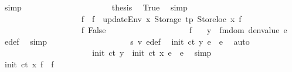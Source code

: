 \begin{isabellebody}
\ simp\isanewline
\ \ \ \ \ \ \ \ \ \ \ \ \ \ \ \ \ \ \isamarkupfalse%
\ \isamarkupfalse%
\ {\isacharquery}{\kern0pt}thesis\ \isamarkupfalse%
\ True\ \isamarkupfalse%
\ simp\isanewline
\ \ \ \ \ \ \ \ \ \ \ \ \ \ \ \ \isamarkupfalse%
\isanewline
\ \ \ \ \ \ \ \ \ \ \ \ \ \ \ \ \ \ \isamarkupfalse%
\ f{\isacharprime}{\kern0pt}{\isacharprime}{\kern0pt}\ \ {\isachardoublequoteopen}f{\isacharprime}{\kern0pt}{\isacharprime}{\kern0pt}\ {\isacharequal}{\kern0pt}\ updateEnv\ x\ {\isacharparenleft}{\kern0pt}Storage\ tp{\isacharparenright}{\kern0pt}\ {\isacharparenleft}{\kern0pt}Storeloc\ x{\isacharparenright}{\kern0pt}\ f{\isacharprime}{\kern0pt}{\isachardoublequoteclose}\isanewline
\ \ \ \ \ \ \ \ \ \ \ \ \ \ \ \ \ \ \isamarkupfalse%
\ f{}{\isacharcolon}{\kern0pt}\ False\isanewline
\ \ \ \ \ \ \ \ \ \ \ \ \ \ \ \ \ \ \isamarkupfalse%
\ f{}\ \isamarkupfalse%
\ {\isachardoublequoteopen}{\isasymnot}\ y\ {\isacharbar}{\kern0pt}{\isasymin}{\isacharbar}{\kern0pt}\ fmdom\ {\isacharparenleft}{\kern0pt}denvalue\ e{\isacharprime}{\kern0pt}{\isacharparenright}{\kern0pt}{\isachardoublequoteclose}\ \isamarkupfalse%
\ e{\isacharprime}{\kern0pt}{\isacharunderscore}{\kern0pt}def\ \isamarkupfalse%
\ simp\isanewline
\ \ \ \ \ \ \ \ \ \ \ \ \ \ \ \ \ \ \isamarkupfalse%
\ s{}\ v{}\ e{\isacharprime}{\kern0pt}{\isacharprime}{\kern0pt}{\isacharunderscore}{\kern0pt}def\ \isamarkupfalse%
\ {\isachardoublequoteopen}init\ ct\ y\ e{\isacharprime}{\kern0pt}\ {\isacharequal}{\kern0pt}\ e{\isacharprime}{\kern0pt}{\isacharprime}{\kern0pt}{\isachardoublequoteclose}\ \isamarkupfalse%
\ auto\isanewline
\ \ \ \ \ \ \ \ \ \ \ \ \ \ \ \ \ \ \isamarkupfalse%
\ {\isacharasterisk}{\kern0pt}\ \isamarkupfalse%
\ {\isachardoublequoteopen}{\isacharparenleft}{\kern0pt}init\ ct\ y\ {\isasymcirc}\ init\ ct\ x{\isacharparenright}{\kern0pt}\ e\ {\isacharequal}{\kern0pt}\ e{\isacharprime}{\kern0pt}{\isacharprime}{\kern0pt}{\isachardoublequoteclose}\ \isamarkupfalse%
\ simp\isanewline
\ \ \ \ \ \ \ \ \ \ \ \ \ \ \ \ \ \ \isamarkupfalse%
\ \isamarkupfalse%
\ {\isachardoublequoteopen}init\ ct\ x\ f{\isacharprime}{\kern0pt}\ {\isacharequal}{\kern0pt}\ f{\isacharprime}{\kern0pt}{\isacharprime}{\kern0pt}{\isachardoublequoteclose}\isanewline

\end{isabellebody}
